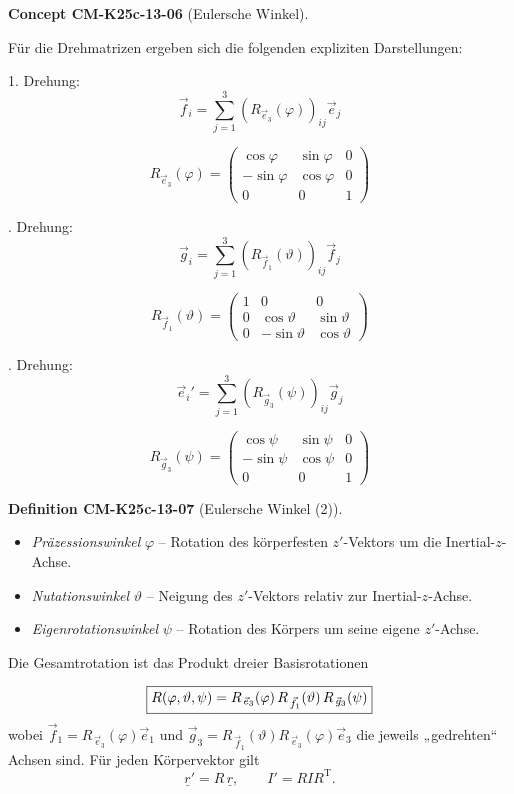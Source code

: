 \documentclass[10pt, letterpaper]{article}
\newcommand{\CustomHeading}[3]{%
  \par\medskip\noindent%
  \textbf{#1 #2} \textnormal{(#3)}.\enskip%
}
\newenvironment{DEF}[2]{\CustomHeading{Definition}{#1}{#2}}{}
\newenvironment{CONC}[2]{\CustomHeading{Concept}{#1}{#2}}{}
\begin{document}
\begin{CONC}{CM-K25c-13-06}{Eulersche Winkel}
\begin{center}
\begin{tikzpicture}[every node/.style={font=\normalsize}, scale=1.1]
\end{tikzpicture}
\end{center}
Für die Drehmatrizen ergeben sich die folgenden expliziten Darstellungen:
\noindent

1. Drehung:
\[\vec{f}_i = \sum_{j=1}^3 (R_{\vec{e}_3}(\varphi))_{ij}\vec{e}_j\]

\[R_{\vec{e}_3}(\varphi) = \begin{pmatrix}
\cos\varphi & \sin\varphi & 0 \\
-\sin\varphi & \cos\varphi & 0 \\
0 & 0 & 1
\end{pmatrix}\]

. Drehung:
\[\vec{g}_i = \sum_{j=1}^3 (R_{\vec{f}_1}(\vartheta))_{ij}\vec{f}_j\]

\[R_{\vec{f}_1}(\vartheta) = \begin{pmatrix}
1 & 0 & 0 \\
0 & \cos\vartheta & \sin\vartheta \\
0 & -\sin\vartheta & \cos\vartheta
\end{pmatrix}\]

. Drehung:
\[\vec{e}_i' = \sum_{j=1}^3 (R_{\vec{g}_3}(\psi))_{ij}\vec{g}_j\]

\[R_{\vec{g}_3}(\psi) = \begin{pmatrix}
\cos\psi & \sin\psi & 0 \\
-\sin\psi & \cos\psi & 0 \\
0 & 0 & 1
\end{pmatrix}\]
\end{CONC}

\begin{DEF}{CM-K25c-13-07}{Eulersche Winkel (2)}
\begin{itemize}
  \item \emph{Präzessionswinkel} $\varphi$  
        – Rotation des körperfesten $z'$-Vektors um die Inertial-$z$-Achse.
  \item \emph{Nutationswinkel} $\vartheta$  
        – Neigung des $z'$-Vektors relativ zur Inertial-$z$-Achse.
  \item \emph{Eigenrotationswinkel} $\psi$  
        – Rotation des Körpers um seine eigene $z'$-Achse.
\end{itemize}

Die Gesamtrotation ist das Produkt dreier Basisrotationen

\[
  \boxed{%
    R(\varphi,\vartheta,\psi)
    =R_{\,\vec e_3}(\varphi)\,
     R_{\,\vec f_1}(\vartheta)\,
     R_{\,\vec g_3}(\psi)
  }
\]
wobei $\vec f_1=R_{\,\vec e_3}(\varphi)\vec e_1$ und  
$\vec g_3=R_{\,\vec f_1}(\vartheta)R_{\,\vec e_3}(\varphi)\vec e_3$ die
jeweils „gedrehten“ Achsen sind.  
Für jeden Körpervektor gilt
\[
  \underline r' = R\,\underline r, 
  \qquad
  I'      = R I R^{\mathrm T}.
\]
\end{DEF}
\end{document}
